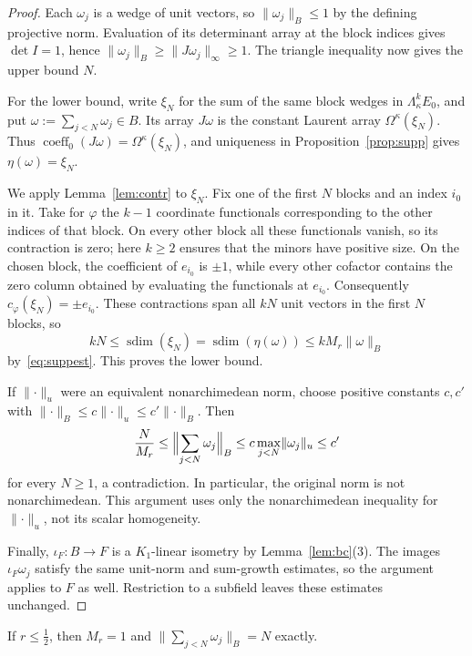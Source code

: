 \documentclass[11pt]{amsart}
\theoremstyle{definition}
\theoremstyle{remark}
\numberwithin{equation}{section}
\newcommand{\norm}[1]{\lVert #1\rVert}
\newcommand{\coeff}{\operatorname{coeff}}
\newcommand{\sdim}{\operatorname{sdim}}
\begin{document}
\begin{proof}
Each $\omega_j$ is a wedge of unit vectors, so $\norm{\omega_j}_B\le1$ by the defining projective norm. Evaluation
of its determinant array at the block indices gives $\det I=1$, hence
$\norm{\omega_j}_B\ge\norm{J\omega_j}_\infty\ge1$. The triangle inequality now gives the upper bound $N$.

For the lower bound, write $\xi_N$ for the sum of the same block wedges in $\Lambda^k_\kappa E_0$, and put
$\omega:=\sum_{j<N}\omega_j\in B$. Its array $J\omega$ is the constant Laurent array $\Omega^\kappa(\xi_N)$.
Thus $\coeff_0(J\omega)=\Omega^\kappa(\xi_N)$, and uniqueness in Proposition~\ref{prop:supp} gives
$\eta(\omega)=\xi_N$.

We apply Lemma~\ref{lem:contr} to $\xi_N$. Fix one of the first $N$ blocks and an index $i_0$ in it. Take for
$\varphi$ the $k-1$ coordinate functionals corresponding to the other indices of that block. On every other
block all these functionals vanish, so its contraction is zero; here $k\ge2$ ensures that the minors have
positive size. On the chosen block, the coefficient of $e_{i_0}$ is $\pm1$, while every other cofactor contains
the zero column obtained by evaluating the functionals at $e_{i_0}$. Consequently
$c_\varphi(\xi_N)=\pm e_{i_0}$. These contractions span all $kN$ unit vectors in the first $N$ blocks, so
\[
kN\le\sdim(\xi_N)=\sdim(\eta(\omega))\le kM_r\norm\omega_B
\]
by~\eqref{eq:suppest}. This proves the lower bound.

If $\norm\cdot_u$ were an equivalent nonarchimedean norm, choose positive constants $c,c'$ with
$\norm\cdot_B\le c\norm\cdot_u\le c'\norm\cdot_B$. Then
\[
\frac{N}{M_r}\le\Bigl\lVert\sum_{j<N}\omega_j\Bigr\rVert_B
\le c\max_{j<N}\norm{\omega_j}_u\le c'
\]
for every $N\ge1$, a contradiction. In particular, the original norm is not nonarchimedean. This argument uses
only the nonarchimedean inequality for $\norm\cdot_u$, not its scalar homogeneity.

Finally, $\iota_F\colon B\to F$ is a $K_1$\nobreakdash-linear isometry by Lemma~\ref{lem:bc}(3). The images
$\iota_F\omega_j$ satisfy the same unit-norm and sum-growth estimates, so the argument applies to $F$ as well.
Restriction to a subfield leaves these estimates unchanged.
\end{proof}

If $r\le\frac12$, then $M_r=1$ and $\norm{\sum_{j<N}\omega_j}_B=N$ exactly.
\end{document}

